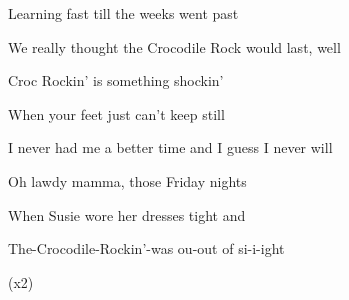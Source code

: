 Learning fast till the weeks went past

We really thought the Crocodile Rock would last, well

 Croc Rockin' is something shockin'

When your feet just can't keep still

 I never had me a better time and I guess I never will

Oh lawdy mamma, those Friday nights

When Susie wore her dresses tight and

 The-Crocodile-Rockin'-was ou-out of si-i-ight

        (x2)
